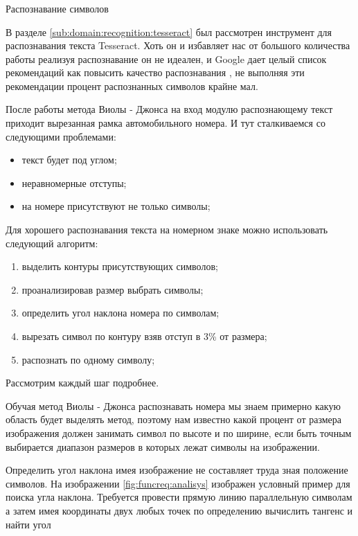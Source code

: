 \subsubsection{}
Распознавание символов

В разделе \ref{sub:domain:recognition:tesseract} был рассмотрен инструмент для распознавания текста Tesseract. Хоть он и избавляет нас от большого количества работы реализуя распознавание он не идеален, и Google дает целый список рекомендаций как повысить качество распознавания \cite{tesseract_impruvment}, не выполняя эти рекомендации процент распознанных символов крайне мал.

После работы метода Виолы - Джонса на вход модулю распознающему текст приходит вырезанная рамка автомобильного номера. И тут сталкиваемся со следующими проблемами:
\begin{itemize}
	\item текст будет под углом;
	\item неравномерные отступы;
	\item на номере присутствуют не только символы;
\end{itemize}


Для хорошего распознавания текста на номерном знаке можно использовать следующий алгоритм:
\begin{enumerate}
	\item выделить контуры присутствующих символов;
	\item проанализировав размер выбрать символы;
	\item определить угол наклона номера по символам;
	\item вырезать символ по контуру взяв отступ в 3\% от размера;
	\item распознать по одному символу;
\end{enumerate} 
Рассмотрим каждый шаг подробнее.

Обучая метод Виолы - Джонса распознавать номера мы знаем примерно какую область будет выделять метод, поэтому нам известно какой процент от размера изображения должен занимать символ по высоте и по ширине, если быть точным выбирается диапазон размеров в которых лежат символы на изображении.

Определить угол наклона имея изображение не составляет труда зная положение символов. На изображении \ref{fig:funcreq:analisys} изображен условный пример для поиска угла наклона. Требуется провести прямую линию параллельную символам а затем имея координаты двух любых точек по определению вычислить тангенс и найти угол

